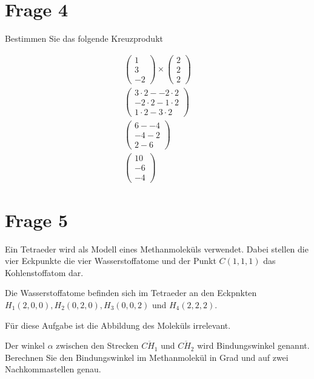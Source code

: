 \section{Frage 4}

Bestimmen Sie das folgende Kreuzprodukt

\begin{align*}
    \begin{pmatrix}
        1 \\ 3 \\ -2
    \end{pmatrix} \times \begin{pmatrix}
                             2 \\ 2 \\ 2
                         \end{pmatrix} \\
    \begin{pmatrix}
        3 \cdot 2 - -2 \cdot 2  \\
        -2  \cdot 2 - 1 \cdot 2 \\
        1 \cdot 2 - 3 \cdot 2
    \end{pmatrix}             \\
    \begin{pmatrix}
        6 - -4 \\
        -4 - 2 \\
        2 - 6
    \end{pmatrix}                      \\
    \begin{pmatrix}
        10 \\ -6 \\ -4
    \end{pmatrix}
\end{align*}

\section{Frage 5}

Ein Tetraeder wird als Modell eines Methanmoleküls verwendet. Dabei stellen die
vier Eckpunkte die vier Wasserstoffatome und der Punkt $C(1,1,1)$ das
Kohlenstoffatom dar.

Die Wasserstoffatome befinden sich im Tetraeder an den Eckpnkten $H_1(2,0,0),
    H_2(0,2,0), H_3(0,0,2)$ und $H_4(2,2,2)$.

Für diese Aufgabe ist die Abbildung des Moleküls irrelevant.

Der winkel $\alpha$ zwischen den Strecken $\overline{CH_1}$ und
$\overline{CH_2}$ wird Bindungswinkel genannt. Berechnen Sie den Bindungswinkel
im Methanmolekül in Grad und auf zwei Nachkommastellen genau.

